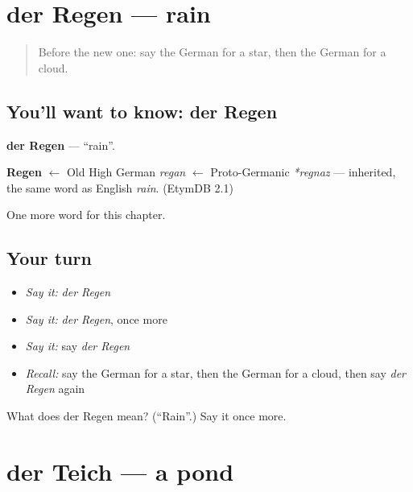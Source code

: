 \section[der Regen]{der Regen — rain}

\label{lesson:GE-C84-regen}



\begin{quote}
Before the new one: say the German for a star, then the German for a cloud.
\end{quote}

\subsection*{You'll want to know: der Regen}
\textbf{der Regen} — \textquotedblleft{}rain\textquotedblright{}.

\begin{cousinweb}
\textbf{Regen} $\leftarrow$ Old High German \emph{regan} $\leftarrow$ Proto-Germanic \emph{*regnaz} — inherited, the same word as English \emph{rain}. (EtymDB 2.1)
\end{cousinweb}

\begin{grammarlens}[title={What you've built}]
One more word for this chapter.
\end{grammarlens}

\subsection*{Your turn}
\begin{itemize}
\raggedright
  \item \emph{Say it:} \emph{der Regen}
  \item \emph{Say it:} \emph{der Regen}, once more
  \item \emph{Say it:} say \emph{der Regen}
  \item \emph{Recall:} say the German for a star, then the German for a cloud, then say \emph{der Regen} again
\end{itemize}

\begin{tcolorbox}[breakable,colback=teal!4,colframe=teal!35!black,title={Before you move on}]
What does der Regen mean? (\textquotedblleft{}Rain\textquotedblright{}.) Say it once more.
\end{tcolorbox}
\section[der Teich]{der Teich — a pond}

